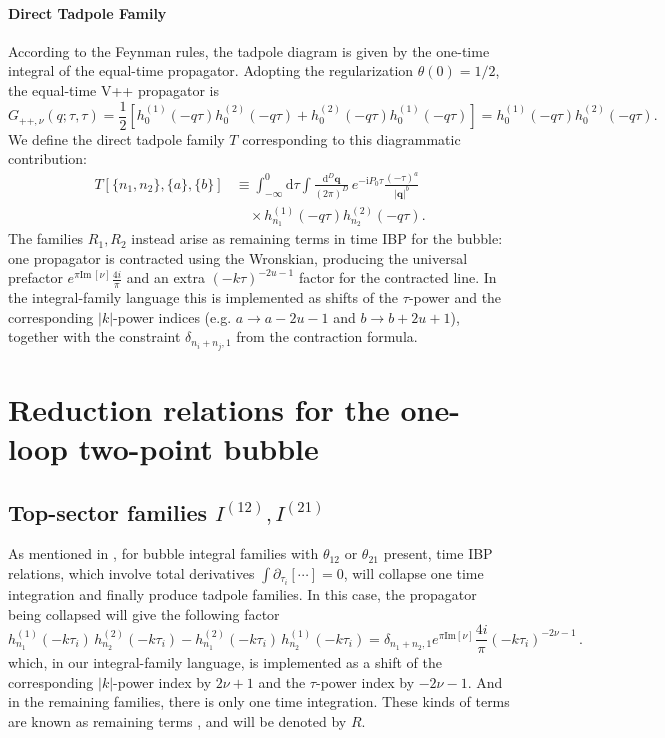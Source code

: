\documentclass[a4paper]{article}
\newcommand{\FR}[2]{\displaystyle\frac{\,{#1}\,}{#2}}
\def\bge{\begin{equation}}
\def\ede{\end{equation}}
\def\di{{\mathrm{d}}}
\def\mb{\mathbf}
\def\pd{\partial}
\def\ii{\mathrm{i}}
\def\to{\rightarrow}
\def\Im{\mathrm{Im}\,}
\begin{document}
\paragraph{Direct Tadpole Family}
According to the Feynman rules, the tadpole diagram is given by the one-time integral of the equal-time propagator. Adopting the regularization $\theta(0)=1/2$, the equal-time V++ propagator is
\begin{equation}
G_{++,\nu}(q;\tau,\tau) = \frac{1}{2}\left[h^{(1)}_
0(-q\tau)h^{(2)}_
0(-q\tau) + h^{(2)}_
0(-q\tau)h^{(1)}_
0(-q\tau)\right] = h^{(1)}_
0(-q\tau)h^{(2)}_
0(-q\tau).
\end{equation}
We define the direct tadpole family $T$ corresponding to this diagrammatic contribution:
\begin{align}
	T[\{n_1,n_2\},\{a\},\{b\}] & \equiv \int_{-\infty}^0 \di\tau \int \FR{\di^D \mb q}{(2\pi)^D}\, e^{-\ii P_0\tau} \frac{(-\tau)^{a}}{|\mb q|^{b}} \nonumber \\
& \quad\times h_{n_1}^{(1)}(-q\tau)h_{n_2}^{(2)}(-q\tau).
\end{align}
The families $R_1,R_2$ instead arise as remaining terms in time IBP for the bubble: one propagator is contracted using the Wronskian, producing the universal prefactor $e^{\pi \Im [\nu]}\frac{4i}{\pi}$ and an extra $(-k\tau)^{-2
u-1}$ factor for the contracted line. In the integral-family language this is implemented as shifts of the $\tau$-power and the corresponding $|k|$-power indices (e.g. $a\to a-2
u-1$ and $b\to b+2
u+1$), together with the constraint $\delta_{n_i+n_j,1}$ from the contraction formula.

\section{Reduction relations for the one-loop two-point bubble}
\label{sec:reductions}
\subsection{Top-sector families $I^{(12)},I^{(21)}$}
As mentioned in \cite{}, for bubble integral families with $\theta_{12}$ or $\theta_{21}$ present, time IBP relations, which involve total derivatives $\int \pd_{\tau_i}[\cdots]=0$, will collapse one time integration and finally produce tadpole families. In this case, the propagator being collapsed will give the following factor
\bge
h_{n_1}^{(1)}(-k\tau_i)\,h_{n_2}^{(2)}(-k\tau_i) - h_{n_1}^{(2)}(-k\tau_i)\,h_{n_2}^{(1)}(-k\tau_i)
= \delta_{n_1+ n_2,1}e^{ \pi \text{Im}[\nu]} \frac{  4 i }{\pi}  (-k\tau_i)^{-2\nu-1} \,  .  \label{eq_propcontract}
\ede
which, in our integral-family language, is implemented as a shift of the corresponding $|k|$-power index by $2\nu+1$ and the $\tau$-power index by $-2\nu-1$. And in the remaining families, there is only one time integration. These kinds of terms are known as remaining terms \cite{}, and will be denoted by $R$.
\end{document}

